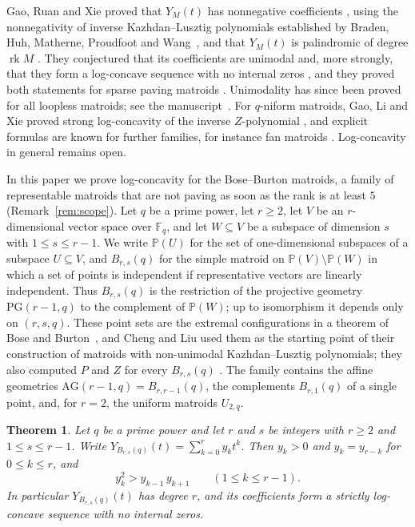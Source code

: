 \documentclass{amsart}
\newtheorem{theorem}{Theorem}[section]
\theoremstyle{remark}
\numberwithin{equation}{section}
\newcommand{\F}{\mathbb{F}}
\newcommand{\PP}{\mathbb{P}}
\newcommand{\PG}{\mathrm{PG}}
\newcommand{\AG}{\mathrm{AG}}
\newcommand{\rk}{\operatorname{rk}}
\begin{document}
Gao, Ruan and Xie proved that $Y_M(t)$ has nonnegative coefficients \cite[Proposition~2.1]{GRX}, using the nonnegativity of inverse Kazhdan--Lusztig polynomials established by Braden, Huh, Matherne, Proudfoot and Wang~\cite{BHMPW}, and that $Y_M(t)$ is palindromic of degree $\rk M$ \cite[Lemma~2.2]{GRX}. They conjectured that its coefficients are unimodal \cite[Conjecture~1.4]{GRX} and, more strongly, that they form a log-concave sequence with no internal zeros \cite[Conjecture~1.5]{GRX}, and they proved both statements for sparse paving matroids \cite[Theorem~1.6]{GRX}. Unimodality has since been proved for all loopless matroids; see the manuscript~\cite{Re}. For $q$-niform matroids, Gao, Li and Xie proved strong log-concavity of the inverse $Z$-polynomial \cite[Corollary~3.9]{GLX}, and explicit formulas are known for further families, for instance fan matroids \cite[Theorem~1.3]{GLL}. Log-concavity in general remains open.

In this paper we prove log-concavity for the Bose--Burton matroids, a family of representable matroids that are not paving as soon as the rank is at least $5$ (Remark~\ref{rem:scope}). Let $q$ be a prime power, let $r\ge 2$, let $V$ be an $r$-dimensional vector space over $\F_q$, and let $W\subseteq V$ be a subspace of dimension $s$ with $1\le s\le r-1$. We write $\PP(U)$ for the set of one-dimensional subspaces of a subspace $U\subseteq V$, and $B_{r,s}(q)$ for the simple matroid on $\PP(V)\setminus\PP(W)$ in which a set of points is independent if representative vectors are linearly independent. Thus $B_{r,s}(q)$ is the restriction of the projective geometry $\PG(r-1,q)$ to the complement of $\PP(W)$; up to isomorphism it depends only on $(r,s,q)$. These point sets are the extremal configurations in a theorem of Bose and Burton~\cite{BB}, and Cheng and Liu used them as the starting point of their construction of matroids with non-unimodal Kazhdan--Lusztig polynomials; they also computed $P$ and $Z$ for every $B_{r,s}(q)$ \cite[Remark~2.7]{CL}. The family contains the affine geometries $\AG(r-1,q)=B_{r,r-1}(q)$, the complements $B_{r,1}(q)$ of a single point, and, for $r=2$, the uniform matroids $U_{2,q}$.

\begin{theorem}\label{thm:main}
Let $q$ be a prime power and let $r$ and $s$ be integers with $r\ge 2$ and $1\le s\le r-1$. Write $Y_{B_{r,s}(q)}(t)=\sum_{k=0}^{r}y_kt^k$. Then $y_k>0$ and $y_k=y_{r-k}$ for $0\le k\le r$, and
\[
  y_k^2>y_{k-1}\,y_{k+1}\qquad(1\le k\le r-1).
\]
In particular $Y_{B_{r,s}(q)}(t)$ has degree $r$, and its coefficients form a strictly log-concave sequence with no internal zeros.
\end{theorem}
\end{document}
